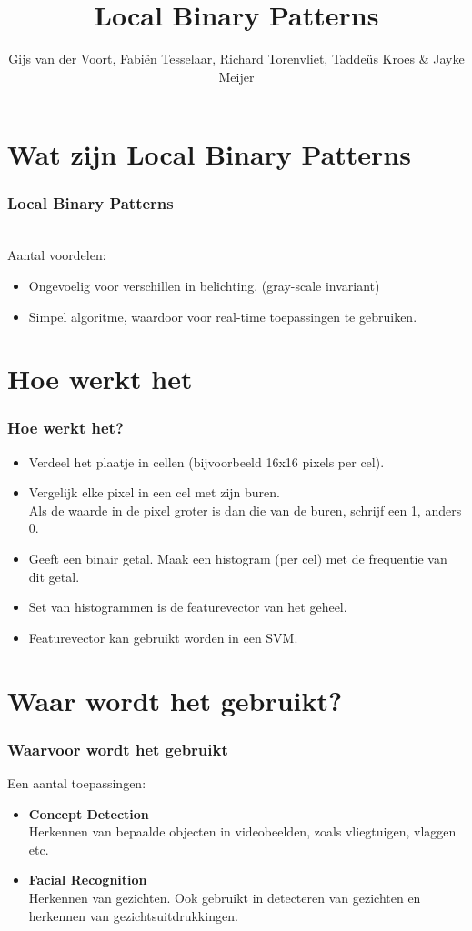 \documentclass{beamer}
\author{Gijs van der Voort, Fabi\"en Tesselaar, Richard Torenvliet, Tadde\"us Kroes \& Jayke Meijer}
\title{Local Binary Patterns}
\begin{document}
	\section{Wat zijn Local Binary Patterns}
		\begin{frame}
			\titlepage
		\end{frame}

		\begin{frame}
			\frametitle{Local Binary Patterns}
			\structure{Type classifier}\\
			\pause
			Aantal voordelen:
			\begin{itemize}
				\item Ongevoelig voor verschillen in belichting. (gray-scale invariant)
				\pause
				\item Simpel algoritme, waardoor voor real-time toepassingen te gebruiken.
			\end{itemize}
		\end{frame}
	
	\section{Hoe werkt het}
		\begin{frame}
			\frametitle{Hoe werkt het?}
			\begin{itemize}
				\item Verdeel het plaatje in cellen (bijvoorbeeld 16x16 pixels per cel).
				\pause
				\item Vergelijk elke pixel in een cel met zijn buren.\\
					  Als de waarde in de pixel groter is dan die van de buren, schrijf een 1, anders 0.
				\pause
				\item Geeft een binair getal. Maak een histogram (per cel) met de frequentie van dit getal.
				\pause
				\item Set van histogrammen is de featurevector van het geheel.
				\pause
				\item Featurevector kan gebruikt worden in een SVM.
			\end{itemize}
		\end{frame}
	
	\section{Waar wordt het gebruikt?}
		\begin{frame}
			\frametitle{Waarvoor wordt het gebruikt}
			Een aantal toepassingen:
			\begin{itemize}
				\item \textbf{Concept Detection}\\
					Herkennen van bepaalde objecten in videobeelden, zoals vliegtuigen, vlaggen etc.
				\item \textbf{Facial Recognition}\\
					Herkennen van gezichten. Ook gebruikt in detecteren van gezichten en herkennen van 
					gezichtsuitdrukkingen.
			\end{itemize}	
		
		\end{frame}	
	
\end{document}
